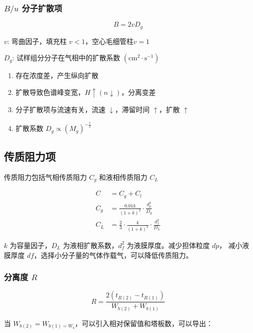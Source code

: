 \subsubsection{$B/u$ 分子扩散项}

\begin{equation}
    B = 2 v D_g
\end{equation}

$v$: 弯曲因子，填充柱 $v < 1$，空心毛细管柱$v = 1$

$D_g$: 试样组分分子在气相中的扩散系数 $(\mathrm{cm}^2 \cdot \mathrm{s}^{-1})$

\begin{enumerate}
    \item 存在浓度差，产生纵向扩散
    \item 扩散导致色谱峰变宽，$H \uparrow (n\downarrow)$，分离变差
    \item 分子扩散项与流速有关，流速 $\downarrow$，滞留时间 $\uparrow$，扩散 $\uparrow$
    \item 扩散系数 $D_g \propto \left(M_{g}\right)^{-\frac{1}{2}}$
\end{enumerate}

\subsection{传质阻力项}

传质阻力包括气相传质阻力 $C_g$ 和液相传质阻力 $C_L$

\begin{align}
    C   & = C_g + C_l                                                     \\
    C_g & = \frac{0.01k}{(1 + k)^2} \cdot \frac{d_p^2}{D_g}               \\
    C_L & = \frac{2}{3} \cdot \frac{k}{(1 + k)^2} \cdot \frac{d_f^2}{D_L}
\end{align}

$k$ 为容量因子，$D_L$ 为液相扩散系数，$d_f^2$ 为液膜厚度。减少担体粒度 $d p$，
减小液膜厚度 $d f$，选择小分子量的气体作载气，可以降低传质阻力。

\subsubsection{分离度 $R$}

\begin{equation}
    R = \frac{2\left(t_{R(2)} - t_{R(1)}\right)}{W_{b(2)} + W_{b(1)}}
\end{equation}

当 $W_{b(2)} = W_{b(1) = W_b}$，可以引入相对保留值和塔板数，可以导出：

